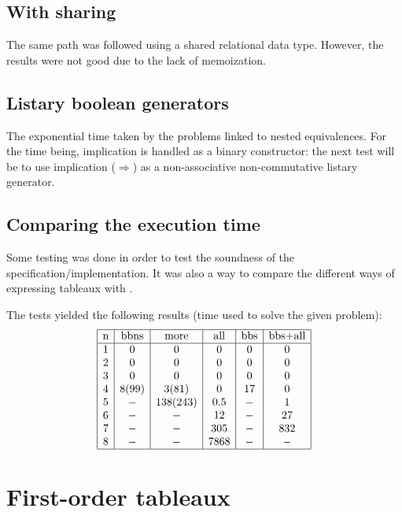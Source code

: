 \subsection{With sharing}
\label{sec:shared_proptab}

The same path was followed using a shared relational
data type. However, the results were not good due to the lack of
memoization. 

\subsection{Listary boolean generators}
\label{sec:list_proptab}

The exponential time taken by the problems linked to nested equivalences.
For the time being, implication is handled as a binary constructor:
the next test will be to use implication ($\Rightarrow$) as a
non-associative non-commutative listary generator.

\subsection{Comparing the execution time}
\label{sec:benchmarks}

Some testing was done in order to test the soundness of the
specification/implementation. It was also a way to compare the
different ways of expressing tableaux with \moca. 

The tests yielded the following results (time used to solve the given
problem):
\[
\begin{array}{|c|c|c|c|c|c|}
  \hline
  \text{n} & \text{bbns} & \text{more} & \text{all} & \text{bbs} &
  \text{bbs+all} \\
  \hline
  1 & 0 & 0  & 0 & 0 & 0\\
  2 & 0 & 0 & 0 & 0 & 0 \\
  3 & 0 & 0 & 0 & 0 & 0 \\
  4 & 8 (99) & 3 (81) & 0 & 17 & 0 \\
  5 & - & 138 (243) & 0.5 & -& 1 \\
  6 & - & - & 12 & - & 27 \\
  7 & - & - & 305 & - & 832 \\
  8 & - & - & 7868 & - & - \\
 \hline
\end{array}
\]


\section{First-order tableaux}
\label{sec:fotab}

